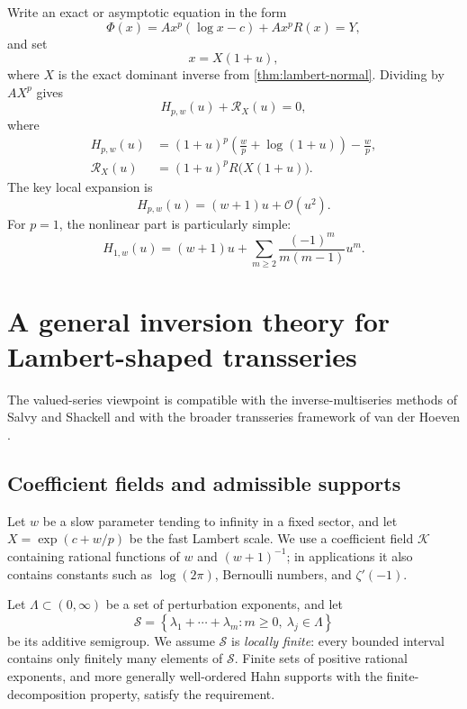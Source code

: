 \documentclass[11pt]{article}
\theoremstyle{definition}
\theoremstyle{remark}
\newcommand{\BigO}{\mathcal O}
\newcommand{\calS}{\mathcal S}
\newcommand{\calK}{\mathcal K}
\begin{document}
Write an exact or asymptotic equation in the form
\begin{equation}\label{eq:perturbed-general}
 \Phi(x)=A x^p(\log x-c)+A x^p R(x)=Y,
\end{equation}
and set
\[
 x=X(1+u),
\]
where \(X\) is the exact dominant inverse from \cref{thm:lambert-normal}.  Dividing by \(AX^p\) gives
\begin{equation}\label{eq:universal-normalized}
 H_{p,w}(u)+\mathscr R_X(u)=0,
\end{equation}
where
\begin{align}
 H_{p,w}(u)
 &= (1+u)^p\left(\frac{w}{p}+\log(1+u)\right)-\frac{w}{p},
 \label{eq:Hpw}\\
 \mathscr R_X(u)
 &= (1+u)^p R\bigl(X(1+u)\bigr).
 \label{eq:RX}
\end{align}
The key local expansion is
\begin{equation}\label{eq:Hlinear}
 H_{p,w}(u)=(w+1)u+\BigO(u^2).
\end{equation}
For \(p=1\), the nonlinear part is particularly simple:
\begin{equation}\label{eq:H-p1}
 H_{1,w}(u)=(w+1)u+
 \sum_{m\ge2}\frac{(-1)^m}{m(m-1)}u^m.
\end{equation}

\section{A general inversion theory for Lambert-shaped transseries}\label{sec:general}

The valued-series viewpoint is compatible with the inverse-multiseries methods of Salvy and Shackell and with the broader transseries framework of van der Hoeven \cite{SalvyShackell,vanderHoeven}.

\subsection{Coefficient fields and admissible supports}

Let \(w\) be a slow parameter tending to infinity in a fixed sector, and let
\(X=\exp(c+w/p)\) be the fast Lambert scale.  We use a coefficient field
\(\calK\) containing rational functions of \(w\) and \((w+1)^{-1}\); in applications it also contains constants such as \(\log(2\pi)\), Bernoulli numbers, and \(\zeta'(-1)\).

Let \(\Lambda\subset(0,\infty)\) be a set of perturbation exponents, and let
\[
 \calS=\left\{\lambda_1+\cdots+\lambda_m:
 m\ge0,\ \lambda_j\in\Lambda\right\}
\]
be its additive semigroup.  We assume \(\calS\) is \emph{locally finite}: every bounded interval contains only finitely many elements of \(\calS\).  Finite sets of positive rational exponents, and more generally well-ordered Hahn supports with the finite-decomposition property, satisfy the requirement.
\end{document}
